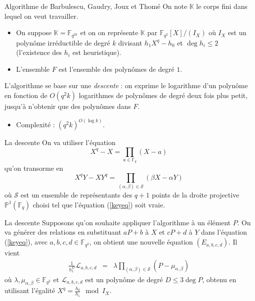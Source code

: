 \documentclass[xcolor=x11names,compress]{beamer}
\theoremstyle{break}
\theoremstyle{sc}
\theoremstyle{definition}
\theoremstyle{remark}
\begin{document}
\begin{frame}{Algorithme de Barbulescu, Gaudry, Joux et Thomé}
  On note $\mathbb{K}$ le corps fini dans lequel on veut travailler.
  \begin{itemize}
    \item On suppose $\mathbb{K}=\mathbb{F}_{q^{2k}}$ et on on représente
  $\mathbb{K}$ par $\mathbb{F}_{q^2}[X]/(I_X)$ où $I_X$ est un polynôme
  irréductible de degré $k$ divisant $h_1X^q-h_0$ et $\deg h_i\leq 2$
  (l'existence des $h_i$ est heuristique).
    \item L'ensemble $F$ est l'ensemble des polynômes de degré $1$.
\end{itemize}

    L'algorithme se base sur une \emph{descente} : on exprime le logarithme d'un
    polynôme en fonction de $O(q^2k)$ logarithmes de polynômes de degré deux
    fois plus petit, jusqu'à n'obtenir que des polynômes dans $F$.
    \begin{itemize}
      \item Complexité : $(q^2k)^{O(\log k)}$.
    \end{itemize}

\end{frame}

\begin{frame}{La descente}
 On va utiliser l'équation 
 \[
   X^q - X = \prod_{a\in\mathbb{F}_q}(X-a)
 \]
 qu'on transorme en
 \begin{equation}
   X^qY - XY^q = \prod_{(\alpha, \beta)\in\mathcal S}(\beta X - \alpha Y)
   \label{keyeq}
 \end{equation}
 où $\mathcal S$ est un ensemble de représentants des $q+1$ points de la droite
 projective $\mathbb{P}^1(\mathbb{F}_q)$ choisi tel que l'équation
 (\ref{keyeq}) soit vraie.
\end{frame}

\begin{frame}{La descente}
  Supposons qu'on souhaite appliquer l'algorithme à un élément $P$. On va
  générer des relations en substituant $aP + b$ à $X$ et $cP + d$ à $Y$ dans l'équation
  (\ref{keyeq}), avec $a, b, c, d \in \mathbb{F}_{q^2}$, on obtient une nouvelle
  équation $(E_{a, b, c, d})$. Il vient 
  \begin{eqnarray*}
    \frac{1}{h_1^D}\mathcal L_{a, b, c, d} &=& \lambda \prod_{(\alpha, \beta)\in\mathcal S}(P-\mu_{\alpha, \beta})
  \end{eqnarray*}
  où $\lambda, \mu_{\alpha, \beta}\in\mathbb{F}_{q^2}$ et $\mathcal L_{a, b, c,
  d}$ est un polynôme de degré $D\leq 3\deg P$, obtenu en utilisant l'égalité $X^q =
  \frac{h_0}{h_1}\mod I_X$.
  
\end{frame}
\end{document}
